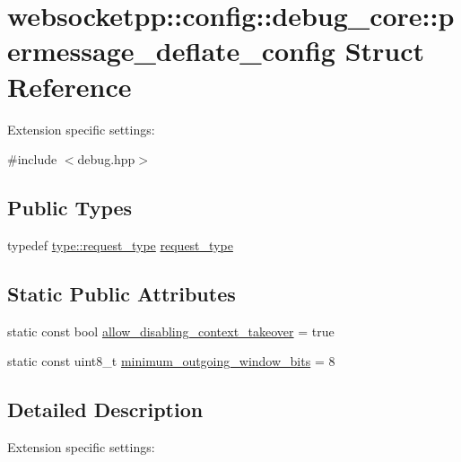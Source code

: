 \hypertarget{structwebsocketpp_1_1config_1_1debug__core_1_1permessage__deflate__config}{}\section{websocketpp\+:\+:config\+:\+:debug\+\_\+core\+:\+:permessage\+\_\+deflate\+\_\+config Struct Reference}
\label{structwebsocketpp_1_1config_1_1debug__core_1_1permessage__deflate__config}


Extension specific settings\+:  




{\ttfamily \#include $<$debug.\+hpp$>$}

\subsection*{Public Types}
\begin{DoxyCompactItemize}
\item 
typedef \hyperlink{structwebsocketpp_1_1config_1_1debug__core_a597de872d5a5b6e9bd2fa1af18ccbbc6}{type\+::request\+\_\+type} \hyperlink{structwebsocketpp_1_1config_1_1debug__core_1_1permessage__deflate__config_aaf933a304bf66b1bdf5bec33fdf013a8}{request\+\_\+type}
\end{DoxyCompactItemize}
\subsection*{Static Public Attributes}
\begin{DoxyCompactItemize}
\item 
static const bool \hyperlink{structwebsocketpp_1_1config_1_1debug__core_1_1permessage__deflate__config_a2c214b49d880b8ca1ebcce9c92d1dec6}{allow\+\_\+disabling\+\_\+context\+\_\+takeover} = true
\item 
static const uint8\+\_\+t \hyperlink{structwebsocketpp_1_1config_1_1debug__core_1_1permessage__deflate__config_ae9ce7b9a7a002339d80dca046e940867}{minimum\+\_\+outgoing\+\_\+window\+\_\+bits} = 8
\end{DoxyCompactItemize}


\subsection{Detailed Description}
Extension specific settings\+: 

